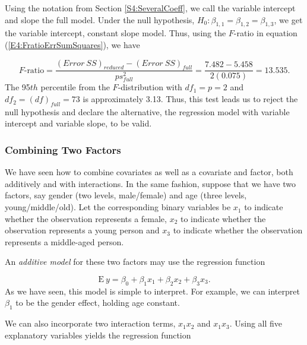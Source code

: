 Using the notation from Section \ref{S4:SeveralCoeff}, we call the
variable intercept and slope the full model. Under the null
hypothesis, $H_0: \beta_{1,1}=\beta_{1,2}=\beta_{1,3}$, we get the
variable intercept, constant slope model. Thus, using the $F$-ratio
in equation (\ref{E4:FratioErrSumSquares}), we have

\begin{equation*}
F\text{-ratio}=\frac{(Error~SS)_{reduced}-(Error~SS)_{full}}{ps_{full}^2}=\frac{{7.482-5.458}}{2(0.075)}=13.535.
\end{equation*}
The 95$th$ percentile from the $F$-distribution with
$df_1=p=2$ and $df_2=(df)_{full}=73$ is approximately 3.13. Thus,
this test leads us to reject the null hypothesis and declare the
alternative, the regression model with variable intercept and
variable slope, to be valid.

\linejed


\subsubsection*{Combining Two Factors}

We have seen how to combine covariates as well as a covariate and
factor, both additively and with interactions. In the same fashion,
suppose that we have two factors, say gender (two levels,
male/female) and age (three levels, young/middle/old). Let the
corresponding binary variables be $x_1$ to indicate whether the
observation represents a female, $x_2$ to indicate whether the
observation represents a young person and $x_3$ to indicate whether
the observation represents a middle-aged person.

An \emph{additive model} for these two factors may use the
regression function

\begin{equation*}
\mathrm{E}~y = \beta_0 + \beta_1 x_1 + \beta_2 x_2+ \beta_3 x_3.
\end{equation*}
As we have seen, this model is simple to interpret. For example, we
can interpret $\beta_1$ to be the gender effect, holding age
constant.

We can also incorporate two interaction terms, $x_1 x_2$ and $x_1
x_3$. Using all five explanatory variables yields the regression
function


